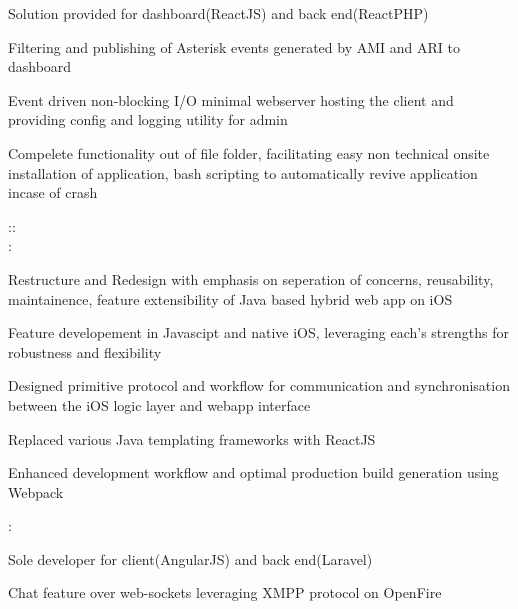 \documentclass[]{hemant-style}
\begin{document}
\begin{minipage}[]{\textwidth}
\begin{minipage}{\textwidth}
\begin{minipage}[t][][c]{.75\textwidth}
                            \begin{hitemize}
                                \item Solution provided for dashboard(ReactJS) and back end(ReactPHP)
                                \item Filtering and publishing of Asterisk events generated by AMI and ARI to dashboard
                                \item Event driven non-blocking I/O minimal webserver hosting the client and  providing config and logging utility for admin
                                \item Compelete functionality out of file folder, facilitating easy non technical onsite installation of application, bash scripting to automatically revive  application incase of crash
                            \end{hitemize}
                            ::\\
                            :
                            \begin{hitemize}
                                \item Restructure and Redesign with emphasis on seperation of concerns, reusability, maintainence, feature extensibility of Java based hybrid web app on iOS
                                \item Feature developement in Javascipt and native iOS, leveraging each’s strengths for robustness and flexibility
                                \item Designed primitive protocol and workflow for communication and synchronisation between the iOS logic layer and webapp interface
                                \item Replaced various Java templating frameworks with ReactJS
                                \item Enhanced development workflow and optimal production build generation using Webpack
                            \end{hitemize}
                            :
                            \begin{hitemize}
                                \item Sole developer for client(AngularJS) and back end(Laravel)
                                \item Chat feature over web-sockets leveraging XMPP protocol on OpenFire

\end{hitemize}
\end{minipage}
\end{minipage}
\end{minipage}
\end{document}
